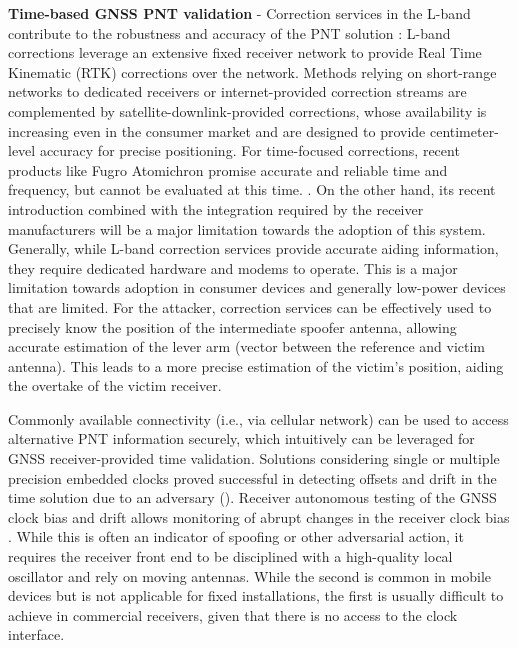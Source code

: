 \textbf{Time-based GNSS PNT validation} - Correction services in the L-band contribute to the robustness and accuracy of the PNT solution \cite{rugamer2023}: L-band corrections leverage an extensive fixed receiver network to provide Real Time Kinematic (RTK) corrections over the network. Methods relying on short-range networks to dedicated receivers or internet-provided correction streams are complemented by satellite-downlink-provided corrections, whose availability is increasing even in the consumer market and are designed to provide centimeter-level accuracy for precise positioning. For time-focused corrections, recent products like Fugro Atomichron promise accurate and reliable time and frequency, but cannot be evaluated at this time. \cite{fugroAtomichron}. On the other hand, its recent introduction combined with the integration required by the receiver manufacturers will be a major limitation towards the adoption of this system. Generally, while L-band correction services provide accurate aiding information, they require dedicated hardware and modems to operate. This is a major limitation towards adoption in consumer devices and generally low-power devices that are limited. For the attacker, correction services can be effectively used to precisely know the position of the intermediate spoofer antenna, allowing accurate estimation of the lever arm (vector between the reference and victim antenna). This leads to a more precise estimation of the victim's position, aiding the overtake of the victim receiver.

Commonly available connectivity (i.e., via cellular network) can be used to access alternative PNT information securely, which intuitively can be leveraged for GNSS receiver-provided time validation. Solutions considering single or multiple precision embedded clocks proved successful in detecting offsets and drift in the time solution due to an adversary (\cite{Arafin2016DetectingOscillators, Arafin2017, Spanghero2022, Hwang2014}). Receiver autonomous testing of the GNSS clock bias and drift allows monitoring of abrupt changes in the receiver clock bias \cite{jafarnia2013PNT}. While this is often an indicator of spoofing or other adversarial action, it requires the receiver front end to be disciplined with a high-quality local oscillator and rely on moving antennas. While the second is common in mobile devices but is not applicable for fixed installations, the first is usually difficult to achieve in commercial receivers, given that there is no access to the clock interface.

